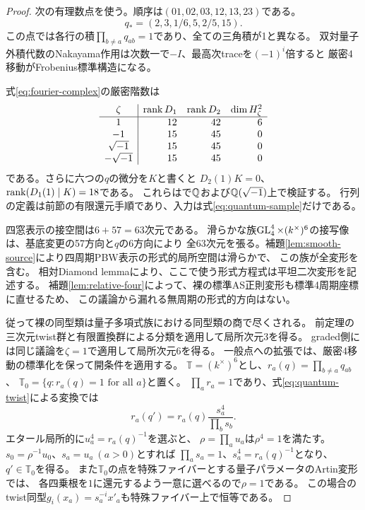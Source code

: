 \begin{proof}
次の有理数点を使う。順序は$(01,02,03,12,13,23)$である。
\begin{equation}\label{eq:quantum-sample}
 q_*=(2,3,1/6,5,2/5,15).
\end{equation}
この点では各行の積$\prod_{b\ne a}q_{ab}=1$であり、全ての三角積が1と異なる。
双対量子外積代数のNakayama作用は次数一で$-I$、最高次traceを$(-1)^i$倍すると
厳密4移動がFrobenius標準構造になる。

式\eqref{eq:fourier-complex}の厳密階数は
\[
\begin{array}{c|rrr}
\zeta&\operatorname{rank} D_1&\operatorname{rank} D_2&\dim H^2_\zeta\\\hline
1&12&42&6\\
-1&15&45&0\\
\sqrt{-1}&15&45&0\\
-\sqrt{-1}&15&45&0
\end{array}
\]
である。さらに六つの$q$の微分を$K$と書くと
$D_2(1)K=0$、$\operatorname{rank}(D_1(1)\mid K)=18$である。
これらはで$\mathbb Q$および$\mathbb Q(\sqrt{-1})$上で検証する。
行列の定義は前節の有限還元手順であり、入力は式\eqref{eq:quantum-sample}だけである。

四窓表示の接空間は$6+57=63$次元である。
滑らかな族$\operatorname{GL}_4^4\times(k^\times)^6$の接写像は、基底変更の57方向と$q$の6方向により
全63次元を張る。補題\ref{lem:smooth-source}により四周期PBW表示の形式的局所空間は滑らかで、
この族が全変形を含む。
相対Diamond lemmaにより、ここで使う形式方程式は平坦二次変形を記述する。
補題\ref{lem:relative-four}によって、裸の標準AS正則変形も標準4周期座標に直せるため、
この議論から漏れる無周期の形式的方向はない。

従って裸の同型類は量子多項式族における同型類の商で尽くされる。
前定理の三次元twist群と有限置換群による分類を適用して局所次元3を得る。
graded側には同じ議論を$\zeta=1$で適用して局所次元6を得る。
一般点への拡張では、厳密4移動の標準化を保って開条件を適用する。
$\mathbb T=(k^\times)^6$とし、$r_a(q)=\prod_{b\ne a}q_{ab}$、
$\mathbb T_0=\{q:r_a(q)=1\text{ for all }a\}$と置く。
$\prod_ar_a=1$であり、式\eqref{eq:quantum-twist}による変換では
\[
 r_a(q')=r_a(q)\frac{s_a^4}{\prod_bs_b}.
\]
エタール局所的に$u_a^4=r_a(q)^{-1}$を選ぶと、
$\rho=\prod_au_a$は$\rho^4=1$を満たす。
$s_0=\rho^{-1}u_0$、$s_a=u_a\ (a>0)$とすれば
$\prod_as_a=1$、$s_a^4=r_a(q)^{-1}$となり、$q'\in\mathbb T_0$を得る。
また$\mathbb T_0$の点を特殊ファイバーとする量子パラメータのArtin変形では、
各四乗根を$1$に還元するよう一意に選べるので$\rho=1$である。
この場合のtwist同型$g_i(x_a)=s_a^{-i}x'_a$も特殊ファイバー上で恒等である。


\end{proof}
